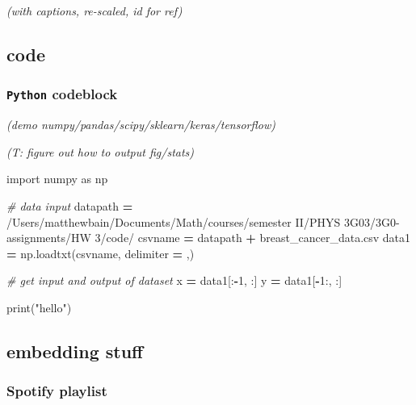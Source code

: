 \documentclass[
]{article}
\newenvironment{Shaded}{\begin{snugshade}}{\end{snugshade}}
\newcommand{\BuiltInTok}[1]{#1}
\newcommand{\CommentTok}[1]{\textcolor[rgb]{0.56,0.35,0.01}{\textit{#1}}}
\newcommand{\DecValTok}[1]{\textcolor[rgb]{0.00,0.00,0.81}{#1}}
\newcommand{\ImportTok}[1]{#1}
\newcommand{\NormalTok}[1]{#1}
\newcommand{\OperatorTok}[1]{\textcolor[rgb]{0.81,0.36,0.00}{\textbf{#1}}}
\newcommand{\StringTok}[1]{\textcolor[rgb]{0.31,0.60,0.02}{#1}}
\begin{document}
\emph{(with captions, re-scaled, id for ref)}

\hypertarget{code}{%
\subsection{code}\label{code}}

\hypertarget{python-codeblock-need-to-figure-out-how-to-output-figstats}{%
\subsubsection{\texorpdfstring{\texttt{Python}
codeblock}{Python codeblock}}\label{python-codeblock-need-to-figure-out-how-to-output-figstats}}

\emph{(demo numpy/pandas/scipy/sklearn/keras/tensorflow)}

\emph{(T: figure out how to output fig/stats)}

\begin{Shaded}
\begin{Highlighting}[]
\ImportTok{import}\NormalTok{ numpy }\ImportTok{as}\NormalTok{ np}

\CommentTok{\# data input}
\NormalTok{datapath }\OperatorTok{=} \StringTok{\textquotesingle{}/Users/matthewbain/Documents/Math/courses/semester II/PHYS 3G03/3G0{-}assignments/HW 3/code/\textquotesingle{}}
\NormalTok{csvname }\OperatorTok{=}\NormalTok{ datapath }\OperatorTok{+} \StringTok{\textquotesingle{}breast\_cancer\_data.csv\textquotesingle{}}
\NormalTok{data1 }\OperatorTok{=}\NormalTok{ np.loadtxt(csvname, delimiter }\OperatorTok{=} \StringTok{\textquotesingle{},\textquotesingle{}}\NormalTok{)}

\CommentTok{\# get input and output of dataset}
\NormalTok{x }\OperatorTok{=}\NormalTok{ data1[:}\OperatorTok{{-}}\DecValTok{1}\NormalTok{, :]}
\NormalTok{y }\OperatorTok{=}\NormalTok{ data1[}\OperatorTok{{-}}\DecValTok{1}\NormalTok{:, :]}

\BuiltInTok{print}\NormalTok{(}\StringTok{"hello"}\NormalTok{)}
\end{Highlighting}
\end{Shaded}

\hypertarget{embedding-stuff}{%
\subsection{embedding stuff}\label{embedding-stuff}}

\hypertarget{spotify-playlist}{%
\subsubsection{Spotify playlist}\label{spotify-playlist}}
\end{document}
